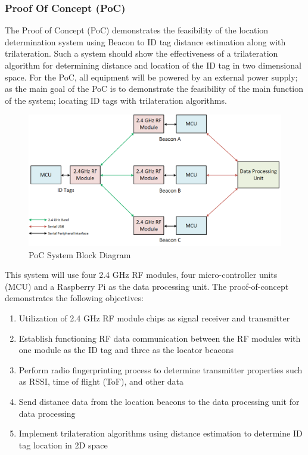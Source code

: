 \break
\subsubsection{Proof Of Concept (PoC)}
\medskip
The Proof of Concept (\Gls{PoC}) demonstrates the feasibility of the location determination system using Beacon to ID tag distance estimation along with trilateration. Such a system should show the effectiveness of a trilateration algorithm for determining distance and location of the ID tag in two dimensional space. For the PoC, all equipment will be powered by an external power supply; as the main goal of the PoC is to demonstrate the feasibility of the main function of the system; locating ID tags with trilateration algorithms.

\begin{figure}[h!]
    \centering
    \includegraphics[width=\linewidth]{./images/01_sys_PoC.png}
    \caption{PoC System Block Diagram}
    \label{fig:PoC_sys_blk}
\end{figure}
\bigskip

This system will use four 2.4 GHz \Gls{RF} modules, four micro-controller units (\Gls{MCU}) and a Raspberry Pi as the data processing unit. The proof-of-concept demonstrates the following objectives:

\begin{enumerate}
    \item Utilization of 2.4 GHz RF module chips as signal receiver and transmitter
    \item Establish functioning RF data communication between the RF modules with one module as the ID tag and three as the locator beacons
    \item Perform radio fingerprinting process to determine transmitter properties such as RSSI, time of flight (\Gls{ToF}), and other data
    \item Send distance data from the location beacons to the data processing unit for data processing
    \item Implement trilateration algorithms using distance estimation to determine ID tag location in 2D space
\end{enumerate}

